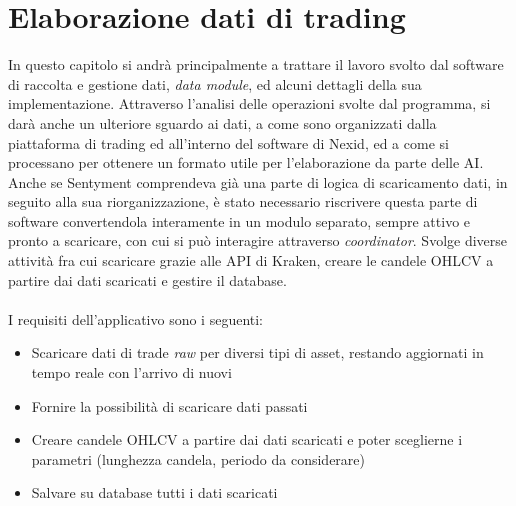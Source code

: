 \documentclass[a4paper,12pt]{report}
\begin{document}
\chapter{Elaborazione dati di trading}
\label{cap3}
In questo capitolo si andrà principalmente a trattare il lavoro svolto dal software di raccolta e gestione dati, \textit{data module}, ed alcuni dettagli della sua implementazione. Attraverso l'analisi delle operazioni svolte dal programma, si darà anche un ulteriore sguardo ai dati, a come sono organizzati dalla piattaforma di trading ed all'interno del software di Nexid, ed a come si processano per ottenere un formato utile per l'elaborazione da parte delle AI.\\
Anche se Sentyment comprendeva già una parte di logica di scaricamento dati, in seguito alla sua riorganizzazione, è stato necessario riscrivere questa parte di software convertendola interamente in un modulo separato, sempre attivo e pronto a scaricare, con cui si può interagire attraverso \textit{coordinator}. Svolge diverse attività fra cui scaricare grazie alle API di Kraken, creare le candele OHLCV a partire dai dati scaricati e gestire il database.\\~\\
I requisiti dell'applicativo sono i seguenti:
\begin{itemize}
	\item Scaricare dati di trade \textit{raw} per diversi tipi di asset, restando aggiornati in tempo reale con l'arrivo di nuovi
	\item Fornire la possibilità di scaricare dati passati
	\item Creare candele OHLCV a partire dai dati scaricati e poter sceglierne i parametri (lunghezza candela, periodo da considerare)
	\item Salvare su database tutti i dati scaricati
\end{itemize}
\end{document}
